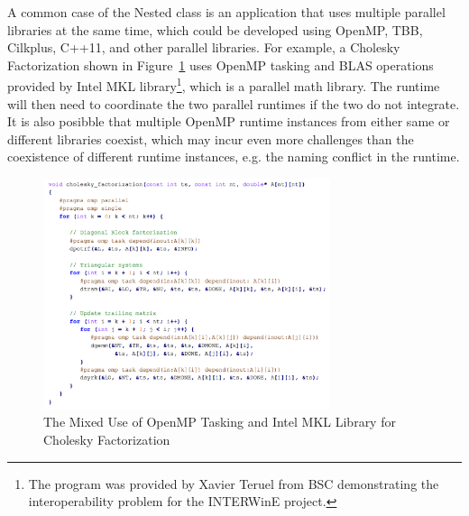 A common case of the Nested class is an application that uses multiple parallel libraries at the same time, which could be developed 
using OpenMP, TBB, Cilkplus, C++11, and other parallel libraries. 
For example, a Cholesky Factorization shown in Figure~\ref{fig:cholesky} uses OpenMP 
tasking and BLAS operations provided by Intel MKL library\footnote{The program was provided by Xavier Teruel from BSC demonstrating the interoperability problem for the INTERWinE project.}, 
which is a parallel math library. The runtime will then need to coordinate the two
parallel runtimes if the two do not integrate. %
It is also posibble that multiple OpenMP runtime instances from either same or different libraries coexist, which
may incur even more challenges than the coexistence of different runtime instances, e.g. the naming conflict 
in the runtime. 
\begin{figure}[h!]
  \centering
      \includegraphics[width=0.75\textwidth]{images/cholesky}
      \caption{The Mixed Use of OpenMP Tasking and Intel MKL Library for Cholesky Factorization~\cite{intertwine}}
 \label{fig:cholesky}
\end{figure}
